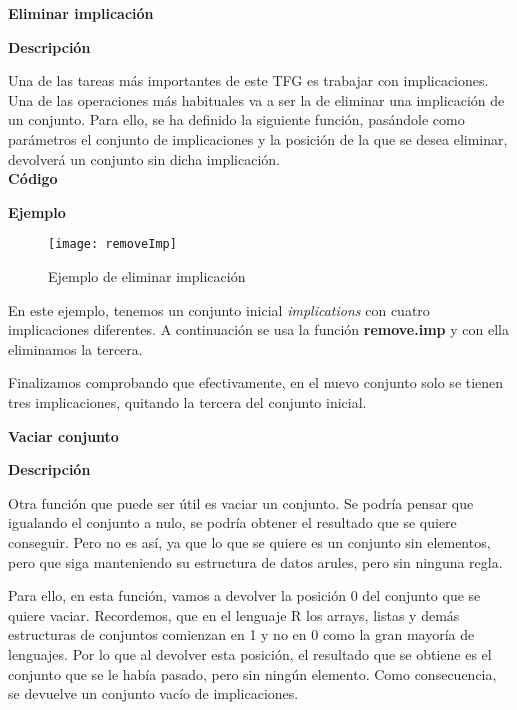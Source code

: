 
\bigskip

\textbf{ \large Eliminar implicaci\'on}

\smallskip

    \textbf{Descripci\'on}

    Una de las tareas m\'as importantes de este TFG es trabajar con implicaciones. Una de las operaciones m\'as habituales 
    va a ser la de eliminar una implicaci\'on de un conjunto. Para ello, se ha definido la siguiente funci\'on, pas\'andole 
    como par\'ametros el conjunto de implicaciones y la posici\'on de la que se desea eliminar, devolver\'a un conjunto sin 
    dicha implicaci\'on.
    \\


    \textbf{C\'odigo}

    
    \bigskip

    \textbf{Ejemplo}

    \begin{figure}[H]
        \centering
        \texttt{[image: removeImp]}
        \caption{Ejemplo de eliminar implicaci\'on}
        \label{fig:removeImp}
    \end{figure}

    En este ejemplo, tenemos un conjunto inicial \textit{implications} con cuatro implicaciones diferentes. A continuaci\'on se usa la 
    funci\'on \textbf{remove.imp} y con ella eliminamos la tercera.

    Finalizamos comprobando que efectivamente, en el nuevo conjunto solo se tienen tres implicaciones, quitando la tercera del conjunto 
    inicial.
    \\


    \bigskip

\textbf{ \large Vaciar conjunto}

\smallskip

    \textbf{Descripci\'on}

    Otra funci\'on que puede ser \'util es vaciar un conjunto. Se podr\'ia pensar que igualando el conjunto a nulo, 
    se podr\'ia obtener el resultado que se quiere conseguir. Pero no es as\'i, ya que lo que se quiere es un conjunto sin 
    elementos, pero que siga manteniendo su estructura de datos arules, pero sin ninguna regla. 
    
    Para ello, en esta funci\'on, vamos a devolver la posici\'on 0 del conjunto que se quiere vaciar. Recordemos, que en el 
    lenguaje R los arrays, listas y dem\'as estructuras de conjuntos comienzan en 1 y no en 0 como la gran mayor\'ia de lenguajes.
    Por lo que al devolver esta posici\'on, el resultado que se obtiene es el conjunto que se le hab\'ia pasado, pero sin ning\'un 
    elemento. Como consecuencia, se devuelve un conjunto vac\'io de implicaciones.
    \\


